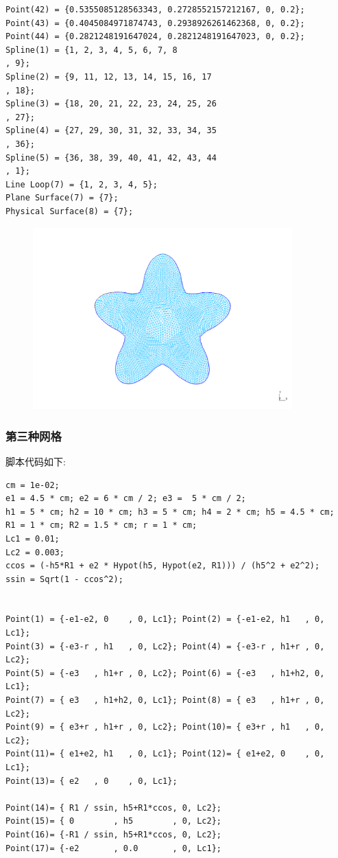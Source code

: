 \documentclass[12pt]{article}
\begin{document}
\begin{CJK}{UTF8}{gkai}
\begin{verbatim}
Point(42) = {0.5355085128563343, 0.2728552157212167, 0, 0.2};
Point(43) = {0.4045084971874743, 0.2938926261462368, 0, 0.2};
Point(44) = {0.2821248191647024, 0.2821248191647023, 0, 0.2};
Spline(1) = {1, 2, 3, 4, 5, 6, 7, 8
, 9};
Spline(2) = {9, 11, 12, 13, 14, 15, 16, 17
, 18};
Spline(3) = {18, 20, 21, 22, 23, 24, 25, 26
, 27};
Spline(4) = {27, 29, 30, 31, 32, 33, 34, 35
, 36};
Spline(5) = {36, 38, 39, 40, 41, 42, 43, 44
, 1};
Line Loop(7) = {1, 2, 3, 4, 5};
Plane Surface(7) = {7};
Physical Surface(8) = {7};
\end{verbatim}
\begin{figure}[H]
	\centering
	\includegraphics[width=10cm]{huaban.png}
	\caption{}  		
\end{figure}
\subsubsection{第三种网格}
脚本代码如下:\\
\begin{verbatim}
cm = 1e-02;
e1 = 4.5 * cm; e2 = 6 * cm / 2; e3 =  5 * cm / 2;
h1 = 5 * cm; h2 = 10 * cm; h3 = 5 * cm; h4 = 2 * cm; h5 = 4.5 * cm;
R1 = 1 * cm; R2 = 1.5 * cm; r = 1 * cm;
Lc1 = 0.01;
Lc2 = 0.003;
ccos = (-h5*R1 + e2 * Hypot(h5, Hypot(e2, R1))) / (h5^2 + e2^2);
ssin = Sqrt(1 - ccos^2);


Point(1) = {-e1-e2, 0    , 0, Lc1}; Point(2) = {-e1-e2, h1   , 0, Lc1};
Point(3) = {-e3-r , h1   , 0, Lc2}; Point(4) = {-e3-r , h1+r , 0, Lc2};
Point(5) = {-e3   , h1+r , 0, Lc2}; Point(6) = {-e3   , h1+h2, 0, Lc1};
Point(7) = { e3   , h1+h2, 0, Lc1}; Point(8) = { e3   , h1+r , 0, Lc2};
Point(9) = { e3+r , h1+r , 0, Lc2}; Point(10)= { e3+r , h1   , 0, Lc2};
Point(11)= { e1+e2, h1   , 0, Lc1}; Point(12)= { e1+e2, 0    , 0, Lc1};
Point(13)= { e2   , 0    , 0, Lc1};

Point(14)= { R1 / ssin, h5+R1*ccos, 0, Lc2};
Point(15)= { 0        , h5        , 0, Lc2};
Point(16)= {-R1 / ssin, h5+R1*ccos, 0, Lc2};
Point(17)= {-e2       , 0.0       , 0, Lc1};


\end{verbatim}
\end{CJK}
\end{document}
